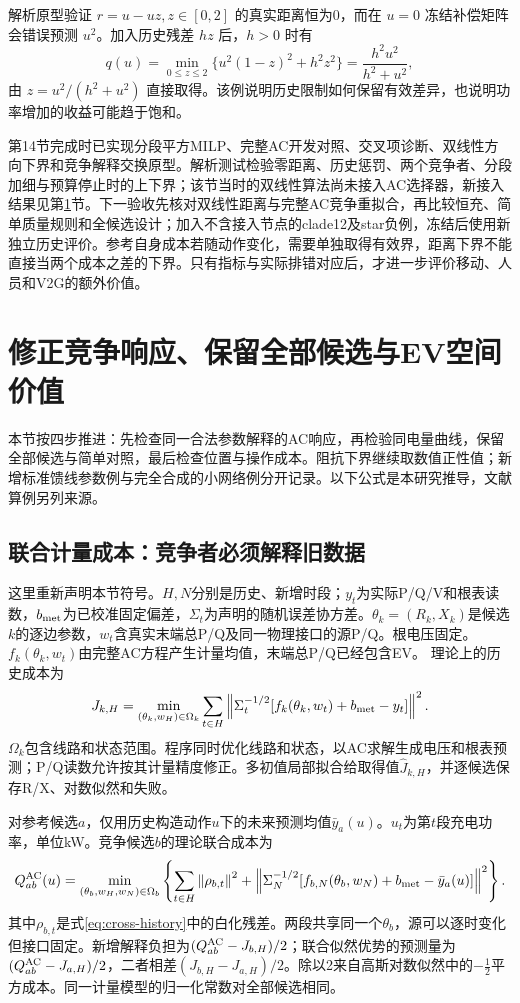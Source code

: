\documentclass[UTF8,fontset=fandol,11pt,a4paper]{ctexart}
\newcommand{\norm}[1]{\left\lVert#1\right\rVert}
\begin{document}
解析原型验证 $r=u-uz,z\in[0,2]$ 的真实距离恒为0，而在 $u=0$ 冻结补偿矩阵会错误预测 $u^2$。加入历史残差 $hz$ 后，$h>0$ 时有
\[
 q(u)=\min_{0\le z\le2}\{u^2(1-z)^2+h^2z^2\}
      =\frac{h^2u^2}{h^2+u^2},
\]
由 $z=u^2/(h^2+u^2)$ 直接取得。该例说明历史限制如何保留有效差异，也说明功率增加的收益可能趋于饱和。

第14节完成时已实现分段平方MILP、完整AC开发对照、交叉项诊断、双线性方向下界和竞争解释交换原型。解析测试检验零距离、历史惩罚、两个竞争者、分段加细与预算停止时的上下界；该节当时的双线性算法尚未接入AC选择器，新接入结果见第\ref{sec:moving-cross}节。下一验收先核对双线性距离与完整AC竞争重拟合，再比较恒充、简单质量规则和全候选设计；加入不含接入节点的clade12及star负例，冻结后使用新独立历史评价。参考自身成本若随动作变化，需要单独取得有效界，距离下界不能直接当两个成本之差的下界。只有指标与实际排错对应后，才进一步评价移动、人员和V2G的额外价值。


\section{修正竞争响应、保留全部候选与EV空间价值}
\label{sec:moving-cross}
本节按四步推进：先检查同一合法参数解释的AC响应，再检验同电量曲线，保留全部候选与简单对照，最后检查位置与操作成本。阻抗下界继续取数值正性值；新增标准馈线参数例与完全合成的小网络例分开记录。以下公式是本研究推导，文献算例另列来源。

\subsection{联合计量成本：竞争者必须解释旧数据}
这里重新声明本节符号。$H,N$分别是历史、新增时段；$y_t$为实际P/Q/V和根表读数，$b_{\rm met}$为已校准固定偏差，$\Sigma_t$为声明的随机误差协方差。$\theta_k=(R_k,X_k)$是候选$k$的逐边参数，$w_t$含真实末端总P/Q及同一物理接口的源P/Q。根电压固定。$f_k(\theta_k,w_t)$由完整AC方程产生计量均值，末端总P/Q已经包含EV。
理论上的历史成本为
\begin{equation}
 J_{k,H}=\min_{(\theta_k,w_H)\in\Omega_k}
 \sum_{t\in H}\norm{\Sigma_t^{-1/2}
 [f_k(\theta_k,w_t)+b_{\rm met}-y_t]}^2.
 \label{eq:cross-history}
\end{equation}
$\Omega_k$包含线路和状态范围。程序同时优化线路和状态，以AC求解生成电压和根表预测；P/Q读数允许按其计量精度修正。多初值局部拟合给取得值$\hat J_{k,H}$，并逐候选保存R/X、对数似然和失败。

对参考候选$a$，仅用历史构造动作$u$下的未来预测均值$\bar y_a(u)$。$u_t$为第$t$段充电功率，单位kW。竞争候选$b$的理论联合成本为
\begin{equation}
 Q^{\rm AC}_{a b}(u)=\min_{(\theta_b,w_H,w_N)\in\Omega_b}
 \left\{\sum_{t\in H}\norm{\rho_{b,t}}^2+
 \norm{\Sigma_N^{-1/2}[f_{b,N}(\theta_b,w_N)+b_{\rm met}-\bar y_a(u)]}^2\right\}.
 \label{eq:cross-ac-cost}
\end{equation}
其中$\rho_{b,t}$是式\eqref{eq:cross-history}中的白化残差。两段共享同一个$\theta_b$，源可以逐时变化但接口固定。新增解释负担为$(Q^{\rm AC}_{ab}-J_{b,H})/2$；联合似然优势的预测量为$(Q^{\rm AC}_{ab}-J_{a,H})/2$，二者相差$(J_{b,H}-J_{a,H})/2$。除以2来自高斯对数似然中的$-\tfrac12$平方成本。同一计量模型的归一化常数对全部候选相同。
\end{document}
